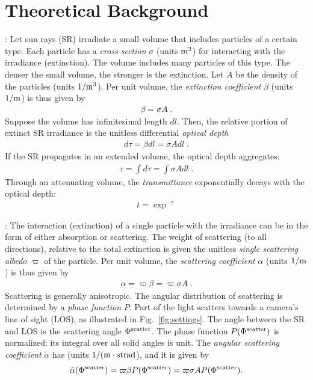 \documentclass[10pt,twocolumn,letterpaper]{article}
\begin{document}
\section{Theoretical Background}
\label{sec:back}
 \vspace{-0.2cm}

:
Let sun rays (SR) irradiate a small volume that includes particles of a certain type.
Each particle has a {\em cross section} $\sigma$ (units ${\rm m}^2$)
for interacting with the irradiance (extinction).  The volume includes
many particles of this type. The denser the small volume, the stronger is the extinction.
Let $A$ be the density of the particles (units $1/{\rm m}^3$). Per unit volume, the {\em extinction coefficient} $\beta$ (units $1/{\rm m}$)
is thus given by
\begin{align}
  \beta= \sigma A
  \;.
  \label{eq:extinctc}
\end{align}
Suppose the volume has infinitesimal length $dl$. Then, the relative portion of extinct SR irradiance is
the unitless differential {\em optical depth}
\begin{align}
  d\tau= \beta dl=\sigma A dl
  \;.
  \label{eq:extinct}
\end{align}
If the SR propagates in an extended volume, the optical depth aggregates:
\begin{align}
  \tau= \int d\tau=\int \sigma A dl
  \;.
  \label{eq:tau}
\end{align}
Through an attenuating volume, the {\em transmittance} exponentially decays with the optical depth:
\begin{align}
  t=\exp^{-\tau}
  \label{eq:beer-lambert}
\end{align}


: The interaction (extinction) of a single particle with the irradiance
can be in the form of either absorption or scattering. The weight of scattering (to all directions), relative to the total extinction is given the unitless {\em single scattering albedo} $\varpi$ of the particle.
Per unit volume, the {\em scattering coefficient} $\alpha$ (units $1/{\rm m}$)
is thus given by
\begin{align}
  \alpha= \varpi\beta=\varpi \sigma A
  \;.
  \label{eq:alph}
\end{align}
Scattering is generally anisotropic. The angular distribution of scattering is determined by
a {\em phase function} $P$. Part of the light scatters towards a camera's line of sight (LOS), as illustrated in
Fig.~\ref{fig:settings}. The angle between the SR and LOS is the scattering angle $\Phi^{\rm scatter}$. The phase function
$P(\Phi^{\rm scatter})$ is normalized: its integral over all solid angles is unit. The {\em angular scattering coefficient}
$\tilde\alpha$ has (units $1/({\rm m}\cdot{{\rm strad}}$), and it is given by
\begin{align}
  \tilde\alpha(\Phi^{\rm scatter}) = \varpi\beta P(\Phi^{\rm scatter}) = \varpi \sigma A P(\Phi^{\rm scatter}).  \label{eq:alphabasic}
\end{align}
\end{document}
